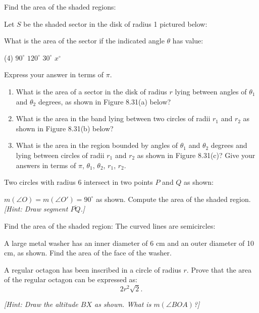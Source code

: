 \documentclass[12pt]{book} %
\begin{document}
\begin{ExerciseList}

\Exercise Find the area of the shaded regions:


\Exercise Let $S$ be the shaded sector in the disk of radius 1 pictured below:


What is the area of the sector if the indicated angle $\theta$ has value:
\begin{tasks}(4)
\task[(a)] $90^\circ$
\task[(b)] $120^\circ$
\task[(c)] $30^\circ$
\task[(d)] $x^\circ$
\end{tasks}
Express your answer in terms of $\pi$.

\Exercise
\begin{enumerate}
\item[(a)] What is the area of a sector in the disk of radius $r$ lying between angles of $\theta_1$ and $\theta_2$ degrees, as shown in Figure 8.31(a) below?

\item[(b)] What is the area in the band lying between two circles of radii $r_1$ and $r_2$ as shown in Figure 8.31(b) below?

\item[(c)] What is the area in the region bounded by angles of $\theta_1$ and $\theta_2$ degrees and lying between circles of radii $r_1$ and $r_2$ as shown in Figure 8.31(c)? Give your answers in terms of $\pi$, $\theta_1$, $\theta_2$, $r_1$, $r_2$.
\end{enumerate}


\Exercise Two circles with radius 6 intersect in two points $P$ and $Q$ as shown:


$m(\angle O)=m(\angle O')=90^\circ$ as shown. Compute the area of the shaded region.
\textit{[Hint: Draw segment $\overline{PQ}$.]}

\Exercise Find the area of the shaded region: The curved lines are semicircles:


\Exercise A large metal washer has an inner diameter of 6 cm and an outer diameter of 10 cm, as shown. Find the area of the face of the washer.


\Exercise A regular octagon has been inscribed in a circle of radius $r$. Prove that the area of the regular octagon can be expressed as:
\[
2r^2\sqrt{2}.
\]

\textit{[Hint: Draw the altitude $BX$ as shown. What is $m(\angle BOA)$?]}

\end{ExerciseList}
\end{document}
